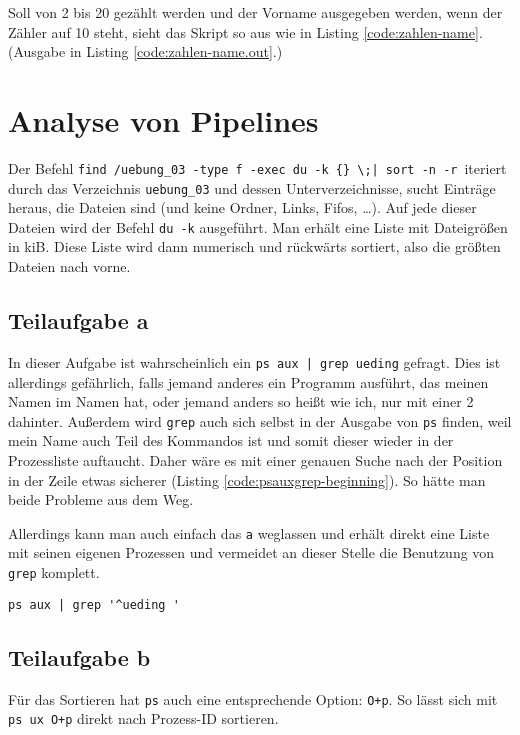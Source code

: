 Soll von 2 bis 20 gezählt werden und der Vorname ausgegeben werden, wenn der Zähler auf 10 steht, sieht das Skript so aus wie in Listing \ref{code:zahlen-name}. (Ausgabe in Listing \ref{code:zahlen-name.out}.)




\section{Analyse von Pipelines}

Der Befehl \verb#find /uebung_03 -type f -exec du -k {} \;| sort -n -r#\ iteriert durch das Verzeichnis \verb#uebung_03# und dessen Unterverzeichnisse, sucht Einträge heraus, die Dateien sind (und keine Ordner, Links, Fifos, …). Auf jede dieser Dateien wird der Befehl \texttt{du -k} ausgeführt. Man erhält eine Liste mit Dateigrößen in kiB. Diese Liste wird dann numerisch und rückwärts sortiert, also die größten Dateien nach vorne.

\subsection{Teilaufgabe a}
In dieser Aufgabe ist wahrscheinlich ein \verb#ps aux | grep ueding# gefragt. Dies ist allerdings gefährlich, falls jemand anderes ein Programm ausführt, das meinen Namen im Namen hat, oder jemand anders so heißt wie ich, nur mit einer 2 dahinter. Außerdem wird \texttt{grep} auch sich selbst in der Ausgabe von \texttt{ps} finden, weil mein Name auch Teil des Kommandos ist und somit dieser wieder in der Prozessliste auftaucht. Daher wäre es mit einer genauen Suche nach der Position in der Zeile etwas sicherer (Listing \ref{code:psauxgrep-beginning}). So hätte man beide Probleme aus dem Weg.

Allerdings kann man auch einfach das \texttt{a} weglassen und erhält direkt eine Liste mit seinen eigenen Prozessen und vermeidet an dieser Stelle die Benutzung von \texttt{grep} komplett.

\begin{lstlisting}[caption=Einschänkung des Suchbereichs, float=htb, label=code:psauxgrep-beginning]
ps aux | grep '^ueding '
\end{lstlisting}

\subsection{Teilaufgabe b}
Für das Sortieren hat \texttt{ps} auch eine entsprechende Option: \texttt{O+p}. So lässt sich mit \texttt{ps ux O+p} direkt nach Prozess-ID sortieren.

